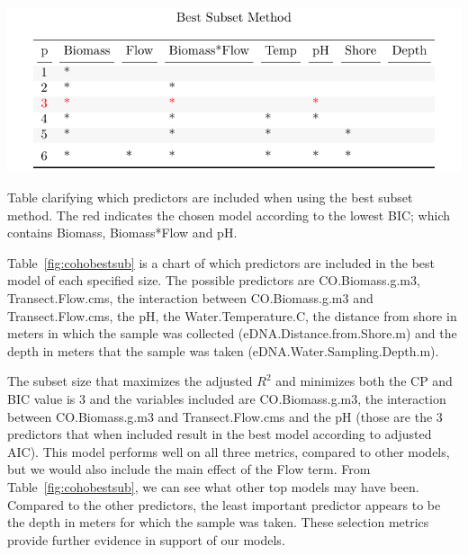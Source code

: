 \begin{table}[H]
\includegraphics{Chapter5Images/best_subredo.pdf}
\caption{ \hspace{1mm} Table clarifying which predictors are included when using the best subset method. The red indicates the chosen model according to the lowest BIC; which contains Biomass, Biomass*Flow and pH.}
\label{fig:cohobestsub}
\end{table}

Table~\ref{fig:cohobestsub} is a chart of which predictors are included in the best model of each specified size. The possible predictors are CO.Biomass.g.m3, Transect.Flow.cms, the interaction between CO.Biomass.g.m3 and Transect.Flow.cms, the pH, the Water.Temperature.C, the distance from shore in meters in which the sample was collected (eDNA.Distance.from.Shore.m) and the depth in meters that the sample was taken (eDNA.Water.Sampling.Depth.m).

\vspace{5mm}

The subset size that maximizes the adjusted $R^{2}$ and minimizes both the CP and BIC value is 3 and the variables included are CO.Biomass.g.m3, the interaction between CO.Biomass.g.m3 and Transect.Flow.cms and the pH (those are the 3 predictors that when included result in the best model according to adjusted AIC). This model performs well on all three metrics, compared to other models, but we would also include the main effect of the Flow term. From Table~\ref{fig:cohobestsub}, we can see what other top models may have been. Compared to the other predictors, the least important predictor appears to be the depth in meters for which the sample was taken. These selection metrics provide further evidence in support of our models.


